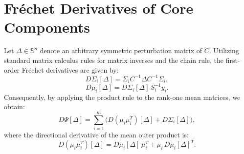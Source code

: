 \documentclass[11pt,a4paper]{article}
\begin{document}
\section{Fr\'echet Derivatives of Core Components}
Let $\Delta \in \mathbb{S}^n$ denote an arbitrary symmetric perturbation matrix of $C$. Utilizing standard matrix calculus rules for matrix inverses and the chain rule, the first-order Fr\'echet derivatives are given by:
\begin{equation}\label{eq:dSigma}
D\Sigma_i[\Delta] = \Sigma_i C^{-1} \Delta C^{-1} \Sigma_i,
\end{equation}
\begin{equation}
D\mu_i[\Delta] = D\Sigma_i[\Delta] \, S_i^{-1} y_i.
\end{equation}
Consequently, by applying the product rule to the rank-one mean matrices, we obtain:
\begin{equation}\label{eq:dPsi}
D\Psi[\Delta] = \sum_{i=1}^m \big( D(\mu_i\mu_i^T)[\Delta] + D\Sigma_i[\Delta] \big),
\end{equation}
where the directional derivative of the mean outer product is:
\begin{equation}
D(\mu_i\mu_i^T)[\Delta] = D\mu_i[\Delta]\,\mu_i^T + \mu_i\,D\mu_i[\Delta]^T.
\end{equation}
\end{document}
